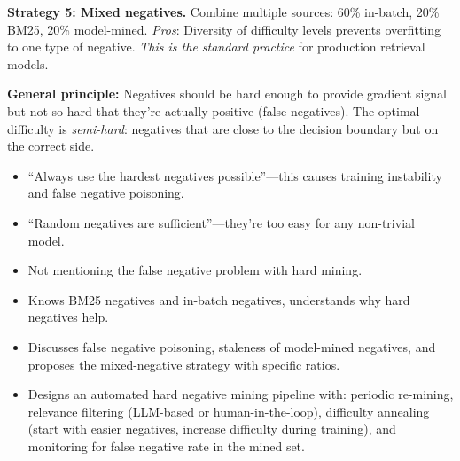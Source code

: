 \begin{interviewq}
\textbf{Strategy 5: Mixed negatives.} Combine multiple sources: 60\% in-batch, 20\% BM25, 20\% model-mined. \textit{Pros}: Diversity of difficulty levels prevents overfitting to one type of negative. \textit{This is the standard practice} for production retrieval models.

\textbf{General principle:} Negatives should be hard enough to provide gradient signal but not so hard that they're actually positive (false negatives). The optimal difficulty is \textit{semi-hard}: negatives that are close to the decision boundary but on the correct side.

\redflags
\begin{itemize}
    \item ``Always use the hardest negatives possible''---this causes training instability and false negative poisoning.
    \item ``Random negatives are sufficient''---they're too easy for any non-trivial model.
    \item Not mentioning the false negative problem with hard mining.
\end{itemize}


\goodgreat
\begin{itemize}
    \item {} Knows BM25 negatives and in-batch negatives, understands why hard negatives help.
    \item {} Discusses false negative poisoning, staleness of model-mined negatives, and proposes the mixed-negative strategy with specific ratios.
    \item {} Designs an automated hard negative mining pipeline with: periodic re-mining, relevance filtering (LLM-based or human-in-the-loop), difficulty annealing (start with easier negatives, increase difficulty during training), and monitoring for false negative rate in the mined set.
\end{itemize}

\end{interviewq}



